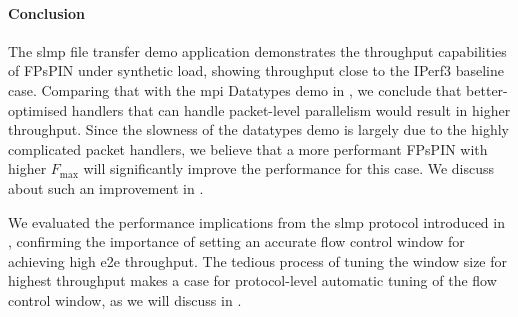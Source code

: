 \paragraph{Conclusion} The \ac{slmp} file transfer demo application demonstrates the throughput capabilities of FPsPIN under synthetic load, showing throughput close to the IPerf3 baseline case.  Comparing that with the \ac{mpi} Datatypes demo in , we conclude that better-optimised handlers that can handle packet-level parallelism would result in higher throughput.  Since the slowness of the datatypes demo is largely due to the highly complicated packet handlers, we believe that a more performant FPsPIN with higher $F_\text{max}$ will significantly improve the performance for this case.  We discuss about such an improvement in .

We evaluated the performance implications from the \ac{slmp} protocol introduced in , confirming the importance of setting an accurate flow control window for achieving high \ac{e2e} throughput.  The tedious process of tuning the window size for highest throughput makes a case for protocol-level automatic tuning of the flow control window, as we will discuss in .